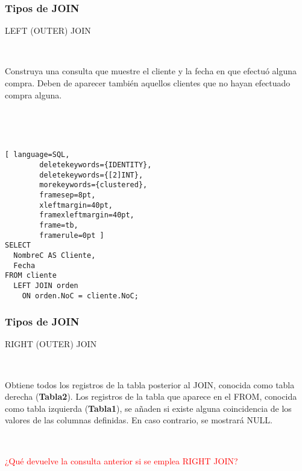 
\begin{frame}[fragile]
	
	\frametitle{Tipos de JOIN}
	
	\begin{center}
		\textcolor{codepurple}{LEFT (OUTER) JOIN}
	\end{center}
	
	\ 
	
	Construya una consulta que muestre el cliente y la fecha en que efectuó alguna compra. Deben de aparecer también aquellos clientes que no hayan efectuado compra alguna.
	
	\pause 
	
	\ 
	
	\ 
	
	\begin{lstlisting}[ language=SQL,
		deletekeywords={IDENTITY},
		deletekeywords={[2]INT},
		morekeywords={clustered},
		framesep=8pt,
		xleftmargin=40pt,
		framexleftmargin=40pt,
		frame=tb,
		framerule=0pt ]
SELECT 
  NombreC AS Cliente, 
  Fecha
FROM cliente
  LEFT JOIN orden 
    ON orden.NoC = cliente.NoC;
\end{lstlisting}
	
\end{frame}


\begin{frame}[fragile]
	
	\frametitle{Tipos de JOIN}
	
	\begin{center}
	
		\textcolor{codepurple}{RIGHT (OUTER) JOIN}
		
		\ 
		
			Obtiene todos los registros de la tabla posterior al \textcolor{codepurple}{JOIN}, conocida como tabla derecha (\textbf{Tabla2}). Los registros de la tabla que aparece en el \textcolor{codepurple}{FROM}, conocida como tabla izquierda (\textbf{Tabla1}), se añaden si existe alguna coincidencia de los valores de las columnas definidas. En caso contrario, se mostrará \textcolor{codepurple}{NULL}.
		
		\begin{venndiagram2sets}[
			labelA={ }, labelOnlyA={Tabla1}, 
			labelB={ }, labelOnlyB={Tabla2}, 
			showframe=false]
			\fillB
		\end{venndiagram2sets}
		
	\end{center}
	
	\pause
	
	\ 
	
	\textcolor{red}{¿Qué devuelve la consulta anterior si se emplea \textcolor{codepurple}{RIGHT JOIN}?}
	
		
\end{frame}

